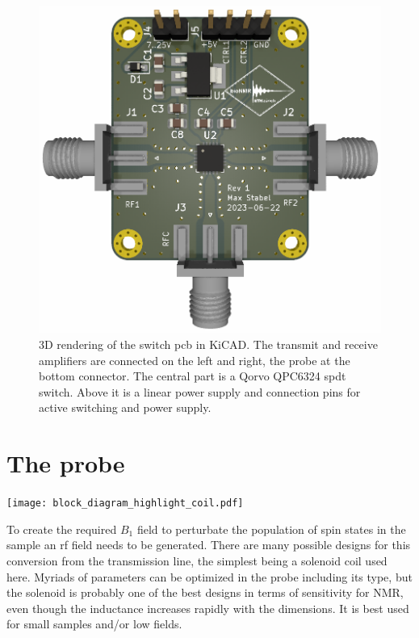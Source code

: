 \begin{figure}[hbt]
    \centering
    \includegraphics[width=\textwidth]{images/tr_switch.png}
    \caption{ 3D rendering of the switch \acrshort{pcb} in KiCAD. The transmit and receive amplifiers are connected on the left and right, the probe at the bottom connector. The central part is a Qorvo QPC6324 \acrfull{spdt} switch. Above it is a linear power supply and connection pins for active switching and power supply.}
\end{figure}

\section{The probe}
\begin{marginfigure}[-4.5\baselineskip]
    \texttt{[image: block\_diagram\_highlight\_coil.pdf]}
\end{marginfigure}
To create the required \(B_1\) field to perturbate the population of spin states in the sample an \acrshort{rf} field needs to be generated. There are many possible designs for this conversion from the transmission line, the simplest being a solenoid coil used here. Myriads of parameters can be optimized in the probe including its type, but the solenoid is probably one of the best designs in terms of sensitivity for NMR, even though the inductance increases rapidly with the dimensions. It is best used for small samples and/or low fields\cite{mispelterNMRProbeheadsBiophysical2015}.

